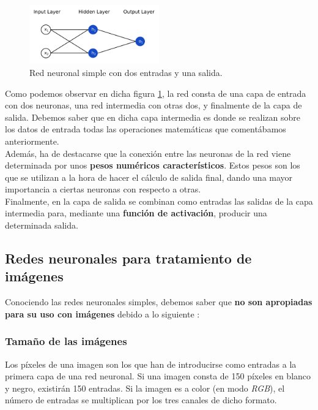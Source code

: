 \documentclass[]{article}
\begin{document}
		\begin{figure}[h]
			\centering
			\includegraphics[width=0.5\textwidth]{./img/neural-network}
			\caption{Red neuronal simple con dos entradas y una salida.}
			\label{neural-network}
		\end{figure}
	
		Como podemos observar en dicha figura \ref{neural-network}, la red consta de una capa de entrada con dos neuronas, una red intermedia con otras dos, y finalmente de la capa de salida. Debemos saber que en dicha capa intermedia es donde se realizan sobre los datos de entrada todas las operaciones matemáticas que comentábamos anteriormente.\\
		
		Además, ha de destacarse que la conexión entre las neuronas de la red viene determinada por unos \textbf{pesos numéricos característicos}. Estos pesos son los que se utilizan a la hora de hacer el cálculo de salida final, dando una mayor importancia a ciertas neuronas con respecto a otras.\\
		
		Finalmente, en la capa de salida se combinan como entradas las salidas de la capa intermedia para, mediante una \textbf{función de activación}, producir una determinada salida.
		
	\subsection{Redes neuronales para tratamiento de imágenes}
	
		Conociendo las redes neuronales simples, debemos saber que \textbf{no son apropiadas para su uso con imágenes} debido a lo siguiente \cite{intro-convolutional-nn}:
		
		\subsubsection*{Tamaño de las imágenes}
		
			Los píxeles de una imagen son los que han de introducirse como entradas a la primera capa de una red neuronal. Si una imagen consta de 150 píxeles en blanco y negro, existirán 150 entradas. Si la imagen es a color (en modo \textit{RGB}), el número de entradas se multiplican por los tres canales de dicho formato.\\
			 
\end{document}
